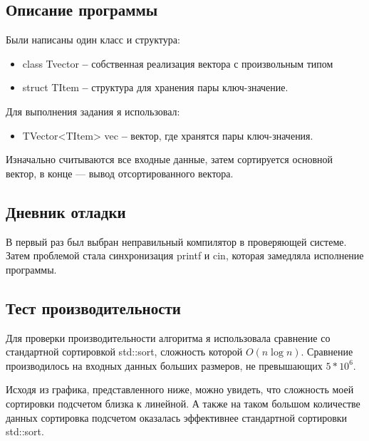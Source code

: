 \documentclass[12pt]{article}
\begin{document}
\subsection*{Описание программы}
Были написаны один класс и структура:
\begin{itemize}
\item class Tvector \textbf{--} собственная реализация вектора с произвольным типом
\item struct TItem \textbf{--} структура для хранения пары ключ-значение.
\end{itemize}

Для выполнения задания я использовал:
\begin{itemize}
\item TVector<TItem> vec \textbf{--} вектор, где хранятся пары ключ-значения. 
\end{itemize}
Изначально считываются все входные данные, затем сортируется основной вектор, в конце — вывод отсортированного вектора.

\subsection*{Дневник отладки}
В первый раз был выбран неправильный компилятор в проверяющей системе. Затем проблемой стала синхронизация printf и cin, которая замедляла исполнение программы.
\subsection*{Тест производительности}

Для проверки производительности алгоритма я использовала сравнение со стандартной сортировкой std::sort, сложность которой ${O}({n}\log n)$.
Сравнение производилось на входных данных больших размеров, не превышающих ${5*10^6}$. 

Исходя из графика, представленного ниже, можно увидеть, что сложность моей сортировки подсчетом близка к линейной. А также на таком большом количестве данных сортировка подсчетом оказалась эффективнее стандартной сортировки std::sort.
\end{document}

